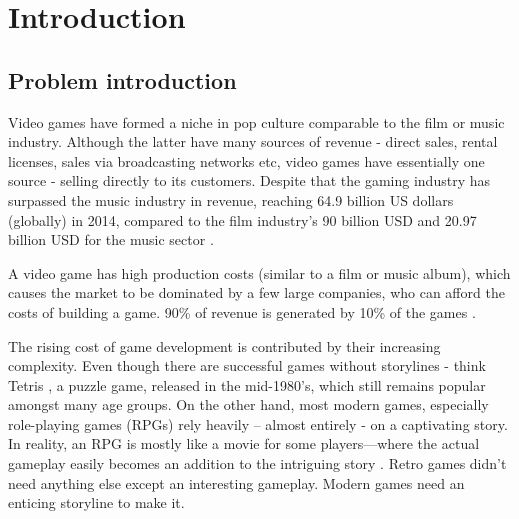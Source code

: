 \documentclass[12p]{article}
\begin{document}
\tableofcontents %
\thispagestyle{plain} %

\newpage %


\section{Introduction}

\subsection{Problem introduction} \label{ProblemIntroduction}

Video games have formed a niche in pop culture comparable to the film or music industry. Although the latter have many sources of revenue - direct sales, rental licenses, sales via broadcasting networks etc, video games have essentially one source - selling directly to its customers. Despite that the gaming industry has surpassed the music industry in revenue, reaching 64.9 billion US dollars (globally) in 2014, compared to the film industry’s 90 billion USD and 20.97 billion USD for the music sector \cite{UnderstandingVideoGames}.

A video game has high production costs (similar to a film or music album), which causes the market to be dominated by a few large companies, who can afford the costs of building a game. 90\% of revenue is generated by 10\% of the games \cite{UnderstandingVideoGames}.

The rising cost of game development is contributed by their increasing complexity. Even though there are successful games without storylines - think Tetris \cite{Tetris}, a puzzle game, released in the mid-1980’s, which still remains popular amongst many age groups. On the other hand, most modern games, especially role-playing games (RPGs) rely heavily – almost entirely - on a captivating story. In reality, an RPG is mostly like a movie for some players—where the actual gameplay easily becomes an addition to the intriguing story \cite{GameDevelopmentEssentials}. Retro games didn’t need anything else except an interesting gameplay. Modern games need an enticing storyline to make it.
\end{document}

